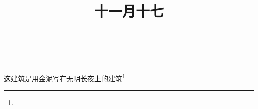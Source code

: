 \title{\date[d=17,m=12,y=2024][year:cn-y,年,month:cn,day:cn,日,·,weekday]·十一月十七 }
这建筑是用金泥写在无明长夜上的建筑\footnote{ }

